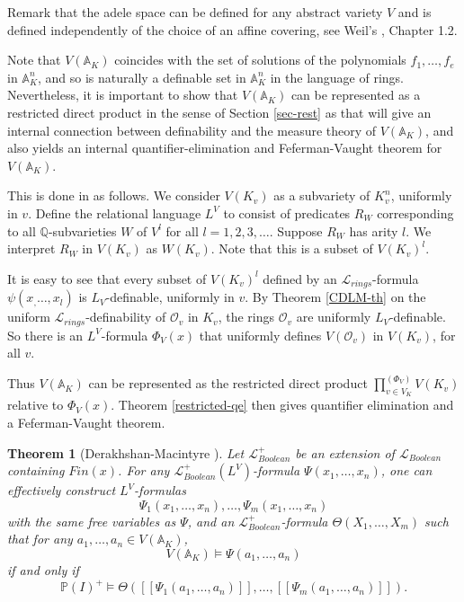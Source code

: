 \documentclass[12pt]{amsart}
\def\A{\mathbb{A}}
\def\P{\mathbb{P}}
\def\cL{\mathcal{L}}
\def\Q{\mathbb{Q}}
\def\cL{\mathcal{L}}
\def\cO{\mathcal{O}}
\newtheorem{thm}{Theorem}[section]
\numberwithin{equation}{section}
\begin{document}
Remark that the adele space can be defined for any abstract variety $V$ and is defined independently of the choice of an affine covering, see Weil's \cite{weil-adeles-gps}, Chapter 1.2. 

Note that $V(\A_K)$ coincides with the set of solutions of the polynomials $f_1,\dots,f_e$ in $\A_K^n$, and so is naturally a definable set in $\A_K^n$ in the language of rings. Nevertheless, it is important to show that 
$V(\A_K)$ can be represented as a restricted direct product in the sense of Section \ref{sec-rest} as that will give an internal connection between definability and the measure theory of $V(\A_K)$, and also yields an internal 
quantifier-elimination and Feferman-Vaught theorem for $V(\A_K)$.

This is done in \cite{DM-ad} as follows. We consider $V(K_v)$ as a subvariety of $K_v^n$, uniformly in $v$. Define the relational 
language $L^V$ to consist of predicates $R_W$ corresponding to all $\Q$-subvarieties $W$ of $V^l$  for all $l=1,2,3,\dots$. 
Suppose $R_W$ has arity $l$. We interpret $R_W$ in $V(K_v)$ as $W(K_v)$. Note that this is a subset of $V(K_v)^l$.

It is easy to see that every subset of $V(K_v)^l$ defined by an $\cL_{rings}$-formula $\psi(x_,\dots,x_l)$ is $L_V$-definable, uniformly in $v$. 
By Theorem \ref{CDLM-th} on the 
uniform $\cL_{rings}$-definability of $\cO_v$ in $K_v$, the rings $\cO_v$ are uniformly $L_V$-definable. 
So there is an $L^V$-formula $\Phi_V(x)$ that uniformly defines $V(\cO_v)$ in $V(K_v)$, for all $v$. 

Thus $V(\A_K)$ can be represented as the restricted direct product $\prod_{v\in V_K}^{(\Phi_V)} V(K_v)$ relative to $\Phi_V(x)$. Theorem \ref{restricted-qe} then gives quantifier elimination and 
a Feferman-Vaught theorem. 


\begin{thm}[Derakhshan-Macintyre {\cite{DM-ad}}]\label{adele-space-th} Let $\cL_{Boolean}^{+}$ be an extension of $\cL_{Boolean}$ containing $Fin(x)$. 
For any $\cL_{Boolean}^{+}(L^V)$-formula $\Psi(x_1,\dots,x_n)$, one can effectively construct 
$L^V$-formulas 
$$\Psi_1(x_1,\dots,x_n),\dots,\Psi_m(x_1,\dots,x_n)$$ 
with the same free variables as $\Psi$, 
and an $\cL_{Boolean}^+$-formula $\Theta(X_1,\dots,X_m)$ 
such that for any $a_1,\dots,a_n\in V(\A_K)$, 
$$V(\A_K)\models \Psi(a_1,\dots,a_n)$$ if and only if 
$$\P(I)^+\models \Theta([[\Psi_1(a_1,\dots,a_n)]],\dots,[[\Psi_m(a_1,\dots,a_n)]]).$$
\end{thm}
\end{document}
